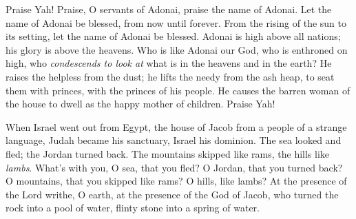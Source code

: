 \begin{biblechapter} %
 Praise Yah! 
Praise, O servants of Adonai, 
praise the name of Adonai.
\verse Let the name of Adonai be blessed, 
from now until forever.
\verse From the rising of the sun to its setting, 
let the name of Adonai be blessed.
\verse Adonai is high above all nations; 
his glory is above the heavens.
\verse Who is like Adonai our God, 
who is enthroned on high,
\verse who \textit{condescends to look at} 
what is in the heavens and in the earth?
\verse He raises the helpless from the dust; 
he lifts the needy from the ash heap,
\verse to seat them with princes, 
with the princes of his people.
\verse He causes the barren woman of the house to dwell 
as the happy mother of children. 
Praise Yah!
\end{biblechapter}

\begin{biblechapter} %
 When Israel went out from Egypt, 
the house of Jacob from a people of a strange language,
\verse Judah became his sanctuary, 
Israel his dominion.
\verse The sea looked and fled; 
the Jordan turned back.
\verse The mountains skipped like rams, 
the hills like \textit{lambs}.
\verse What’s with you, O sea, that you fled? 
O Jordan, that you turned back?
\verse O mountains, that you skipped like rams? 
O hills, like lambs?
\verse At the presence of the Lord writhe, O earth, 
at the presence of the God of Jacob,
\verse who turned the rock into a pool of water, 
flinty stone into a spring of water.
\end{biblechapter}

